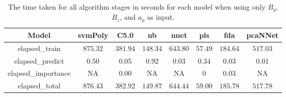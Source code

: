 \begin{table}[!ht]
	\centering
	\begin{tabular}{|c|c|c|c|c|c|c|c|}
		\hline
		Model & svmPoly & C5.0 & nb & nnet & pls & fda & pcaNNet \\ \hline
		elapsed_train & $875.32$ & $381.94$ & $148.34$ & $643.80$ & $57.49$ & $184.64$ & $517.03$ \\ \hline
		elapsed_predict & $0.50$ & $0.05$ & $0.92$ & $0.03$ & $0.34$ & $0.03$ & $0.01$ \\ \hline
		elapsed_importance & NA & $0.00$ & NA & NA & $0$ & $0.03$ & NA \\ \hline
		elapsed_total & $876.43$ & $382.92$ & $149.87$ & $644.44$ & $59.00$ & $185.78$ & $517.78$ \\ \hline
	\end{tabular}
	\caption{The time taken for all algorithm stages in seconds for each model when using only $B_{y}$, $B_{z}$, and $a_{p}$ as input.}
	\label{tab:time:reverse:yzap}
\end{table}
